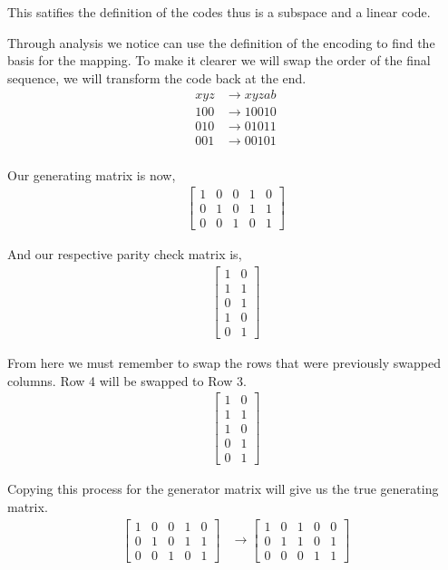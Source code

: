 \documentclass{article}
\begin{document}
This satifies the definition of the codes thus is a subspace and a linear code.

Through analysis we notice can use the definition of the encoding to find the
basis for the mapping. To make it clearer we will swap the order of the
final sequence, we will transform the code back at the end.
\begin{align*}
    xyz &\to xyzab \\
    100 &\to 10010 \\
    010 &\to 01011 \\
    001 &\to 00101 \\
\end{align*}

Our generating matrix is now,
\begin{align*}
    \begin{bmatrix}
        1 & 0 & 0 & 1 & 0 \\
        0 & 1 & 0 & 1 & 1 \\
        0 & 0 & 1 & 0 & 1
    \end{bmatrix}
\end{align*}

And our respective parity check matrix is,
\begin{align*}
    \begin{bmatrix}
        1 & 0 \\
        1 & 1 \\
        0 & 1 \\
        1 & 0 \\
        0 & 1
    \end{bmatrix}
\end{align*}

From here we must remember to swap the rows that were previously swapped
columns. Row 4 will be swapped to Row 3.
\begin{align*}
    \begin{bmatrix}
        1 & 0 \\
        1 & 1 \\
        1 & 0 \\
        0 & 1 \\
        0 & 1
    \end{bmatrix}
\end{align*}

Copying this process for the generator matrix will give us the true
generating matrix.
\begin{align*}
    \begin{bmatrix}
        1 & 0 & 0 & 1 & 0 \\
        0 & 1 & 0 & 1 & 1 \\
        0 & 0 & 1 & 0 & 1
    \end{bmatrix}
    &\to 
    \begin{bmatrix}
        1 & 0 & 1 & 0 & 0 \\
        0 & 1 & 1 & 0 & 1 \\
        0 & 0 & 0 & 1 & 1
    \end{bmatrix} \\
\end{align*}
\end{document}
